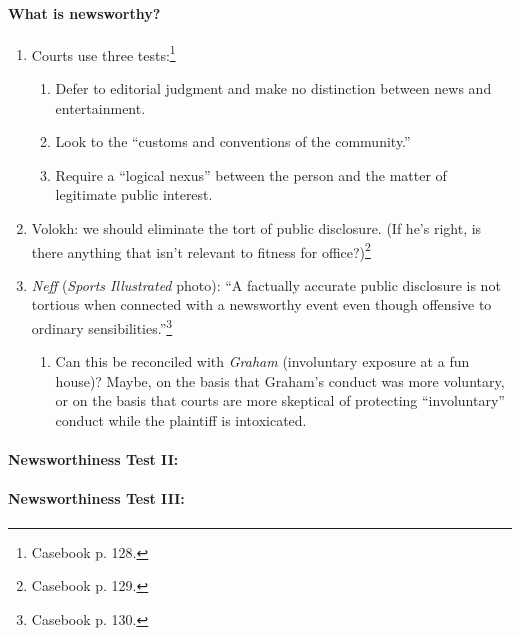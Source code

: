 \paragraph{What is newsworthy?}

\begin{enumerate}
    \item Courts use three tests:\footnote{Casebook p. 128.}
    \begin{enumerate}
        \item Defer to editorial judgment and make no distinction between news 
        and entertainment.
        \item Look to the ``customs and conventions of the community.''
        \item Require a ``logical nexus'' between the person and the matter of 
        legitimate public interest.
    \end{enumerate}
    \item Volokh: we should eliminate the tort of public disclosure. (If he's 
    right, is there anything that isn't relevant to fitness for 
    office?)\footnote{Casebook p. 129.}
    \item \emph{Neff} (\emph{Sports Illustrated} photo): ``A factually accurate 
    public disclosure is not tortious when connected with a newsworthy event 
    even though offensive to ordinary sensibilities.''\footnote{Casebook p. 
    130.}
    \begin{enumerate}
        \item Can this be reconciled with \emph{Graham} (involuntary exposure at 
        a fun house)? Maybe, on the basis that Graham's conduct was more 
        voluntary, or on the basis that courts are more skeptical of protecting
        ``involuntary'' conduct while the plaintiff is intoxicated.
    \end{enumerate}\end{enumerate}

\paragraph{Newsworthiness Test II: \emph{}}


\paragraph{Newsworthiness Test III: \emph{}}


